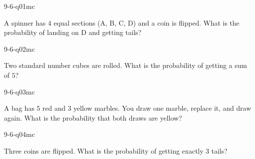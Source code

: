 

\begin{practiceQuestion}{9-6-q01}{mc}
\begin{questionText}
A spinner has $4$ equal sections (A, B, C, D) and a coin is flipped. What is the probability of landing on D and getting tails?
\end{questionText}
\end{practiceQuestion}

\begin{practiceQuestion}{9-6-q02}{mc}
\begin{questionText}
Two standard number cubes are rolled. What is the probability of getting a sum of $5$?
\end{questionText}
\end{practiceQuestion}

\begin{practiceQuestion}{9-6-q03}{mc}
\begin{questionText}
A bag has $5$ red and $3$ yellow marbles. You draw one marble, replace it, and draw again. What is the probability that both draws are yellow?
\end{questionText}
\end{practiceQuestion}

\begin{practiceQuestion}{9-6-q04}{mc}
\begin{questionText}
Three coins are flipped. What is the probability of getting exactly $3$ tails?
\end{questionText}
\end{practiceQuestion}

